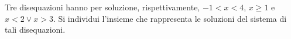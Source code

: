 Tre disequazioni hanno per soluzione, rispettivamente,  
$-1<x<4$, $x \geq 1$ e  $x<2 \vee x>3$. 
Si individui l’insieme che
rappresenta le soluzioni del sistema di tali disequazioni.